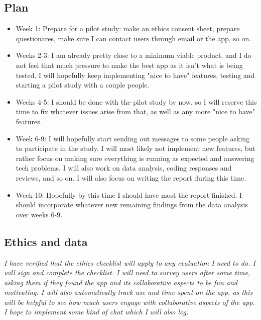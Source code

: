 \documentclass[11pt]{article}
\begin{document}
\subsection{Plan}\label{plan}
\begin{itemize}
\item Week 1: Prepare for a pilot study: make an ethics consent sheet, prepare questionares, make sure I can contact users through email or the app, so on.
\item 
Weeks 2-3: I am already pretty close to a minimum viable product, and I do not feel that much pressure to make the best app as it isn't what is being tested. I will hopefully keep implementing "nice to have" features, testing and starting a pilot study with a couple people. 
\item Weeks 4-5: I should be done with the pilot study by now, so I will reserve this time to fix whatever issues arise from that, as well as any more "nice to have" features. 
\item
Week 6-9: I will hopefully start sending out messages to some people asking to participate in the study. I will most likely not implement new features, but rather focus on making sure everything is running as expected and answering tech problems. I will also work on data analysis, coding responses and reviews, and so on. I will also focus on writing the report during this time.
\item Week 10: Hopefully by this time I should have most the report finished. I should incorporate whatever new remaining findings from the data analysis over weeks 6-9.
\end{itemize}

    
\subsection{Ethics and data}\label{ethics}
\emph{I have verified that the ethics checklist will apply to any evaluation I need to do. I will sign and complete the checklist. I will need to survey users after some time, asking them if they found the app and its collaborative aspects to be fun and motivating. I will also automatically track use and time spent on the app, as this will be helpful to see how much users engage with collaborative aspects of the app. I hope to implement some kind of chat which I will also log.}
\end{document}
